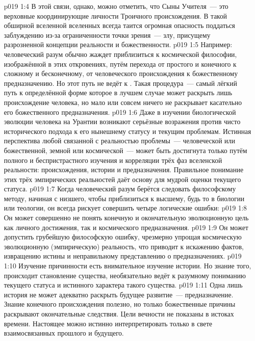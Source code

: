 \vs p019 1:4 В этой связи, однако, можно отметить, что Сыны Учителя~--- это верховные координирующие личности Троичного происхождения. В такой обширной вселенной вселенных всегда таится огромная опасность поддаться заблуждению из\hyp{}за ограниченности точки зрения~--- злу, присущему разрозненной концепции реальности и божественности.
\vs p019 1:5 Например: человеческий разум обычно жаждет приблизиться к космической философии, изображённой в этих откровениях, путём перехода от простого и конечного к сложному и бесконечному, от человеческого происхождения к божественному предназначению. Но этот путь не ведёт к . Такая процедура~--- самый лёгкий путь к определённой форме  которое в лучшем случае может раскрыть лишь происхождение человека, но мало или совсем ничего не раскрывает касательно его божественного предназначения.
\vs p019 1:6 Даже в изучении биологической эволюции человека на Урантии возникают серьёзные возражения против чисто исторического подхода к его нынешнему статусу и текущим проблемам. Истинная перспектива любой связанной с реальностью проблемы~--- человеческой или божественной, земной или космической~--- может быть достигнута только путём полного и беспристрастного изучения и корреляции трёх фаз вселенской реальности: происхождения, истории и предназначения. Правильное понимание этих трёх эмпирических реальностей даёт основу для мудрой оценки текущего статуса.
\vs p019 1:7 \pc Когда человеческий разум берётся следовать философскому методу, начиная с низшего, чтобы приблизиться к высшему, будь то в биологии или теологии, он всегда рискует совершить четыре логические ошибки:
\vs p019 1:8  Он может совершенно не понять конечную и окончательную эволюционную цель как личного достижения, так и космического предназначения.
\vs p019 1:9  Он может допустить грубейшую философскую ошибку, чрезмерно упрощая космическую эволюционную (эмпирическую) реальность, что приводит к искажению фактов, извращению истины и неправильному представлению о предназначениях.
\vs p019 1:10  Изучение причинности есть внимательное изучение истории. Но знание того,  происходит становление существа, необязательно ведёт к разумному пониманию текущего статуса и истинного характера такого существа.
\vs p019 1:11  Одна лишь история не может адекватно раскрыть будущее развитие~--- предназначение. Знание конечного происхождения полезно, но только божественные причины раскрывают окончательные следствия. Цели вечности не показаны в истоках времени. Настоящее можно истинно интерпретировать только в свете взаимосвязанных прошлого и будущего.
